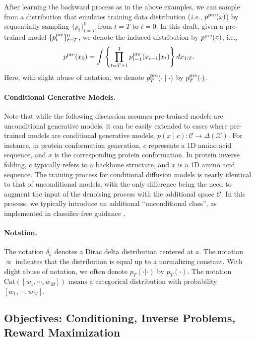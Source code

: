 \documentclass[12pt]{article} %
\begin{document}
{After learning the backward process as in the above examples, we can sample from a distribution that emulates training data distribution (\textit{i.e.}, $p^{\mathrm{pre}}(x)$) by sequentially sampling $\{p_t\}_{t=T}^0$ from $t=T$ to $t=0$. In this draft, given a pre-trained model $\{p^{\mathrm{pre}}_t\}_{t=T}^0$, we denote the induced distribution by $p^{\mathrm{pre}}(x)$, i.e., $$p^{\mathrm{pre}}(x_0)=\int \left \{ \prod_{t=T+1}^1 p^{\mathrm{pre}}_{t-1}(x_{t-1}|x_t)\right \}dx_{1:T}. $$
Here, with slight abuse of notation, we denote $p^{\mathrm{pre}}_{T}(\cdot \mid \cdot)$ by $p^{\mathrm{pre}}_T(\cdot)$. 

\paragraph{Conditional Generative Models.}
Note that while the following discussion assumes pre-trained models are unconditional generative models, it can be easily extended to cases where pre-trained models are conditional generative models, $p(x \mid c): \mathcal{C} \to \Delta(\mathcal{X})$. For instance, in protein conformation generation, $c$ represents a 1D amino acid sequence, and $x$ is the corresponding protein conformation. In protein inverse folding, $c$ typically refers to a backbone structure, and $x$ is a 1D amino acid sequence. The training process for conditional diffusion models is nearly identical to that of unconditional models, with the only difference being the need to augment the input of the denoising process with the additional space $\mathcal{C}$. In this process, we typically introduce an additional ``unconditional class'', as implemented in classifier-free guidance \citep{ho2020denoising}.

\paragraph{Notation.} The notation $\delta_{a}$ denotes a Dirac delta distribution centered at $a$. The notation $\propto$ indicates that the distribution is equal up to a normalizing constant. With slight abuse of notation, we often denote $p_T(\cdot|\cdot)$ by $p_{T}(\cdot)$. The notation $\mathrm{Cat}([w_1,\cdots,w_M])$ means a categorical distribution with probability $[w_1,\cdots,w_M]$. 


\subsection{Objectives: Conditioning, Inverse Problems, Reward Maximization }
\label{sec:goal}


}
\end{document}
